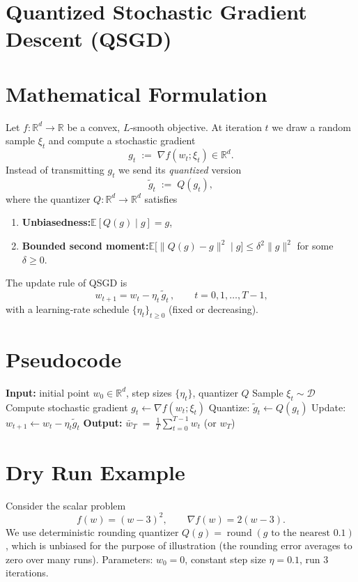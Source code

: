 \documentclass{article}
\newcommand{\E}{\mathbb{E}}
\newcommand{\R}{\mathbb{R}}
\begin{document}
\section*{Quantized Stochastic Gradient Descent (QSGD)}

\section*{Mathematical Formulation}
Let $f:\R^{d}\to\R$ be a convex, $L$‑smooth objective.  
At iteration $t$ we draw a random sample $\xi_{t}$ and compute a stochastic gradient
\[
g_{t}\;:=\;\nabla f(w_{t};\xi_{t})\in\R^{d}.
\]
Instead of transmitting $g_{t}$ we send its \emph{quantized} version
\[
\widetilde g_{t}\;:=\;Q(g_{t}),
\]
where the quantizer $Q:\R^{d}\to\R^{d}$ satisfies  

\begin{enumerate}[label=(\roman*)]
\item \textbf{Unbiasedness:}\quad $\E[Q(g)\mid g]=g$, \;
\item \textbf{Bounded second moment:}\quad $\E\!\big[\|Q(g)-g\|^{2}\mid g\big]\leq\delta^{2}\|g\|^{2}$ for some $\delta\ge0$.
\end{enumerate}
The update rule of QSGD is
\begin{equation}
\boxed{\,w_{t+1}=w_{t}-\eta_{t}\,\widetilde g_{t}\,},\qquad t=0,1,\dots,T-1,
\label{eq:update}
\end{equation}
with a learning‑rate schedule $\{\eta_{t}\}_{t\ge0}$ (fixed or decreasing).

\section*{Pseudocode}
\begin{algorithm}[H]
\caption{Quantized Stochastic Gradient Descent}
\begin{algorithmic}[1]
\State \textbf{Input:} initial point $w_{0}\in\R^{d}$, step sizes $\{\eta_{t}\}$, quantizer $Q$
    \State Sample $\xi_{t}\sim\mathcal{D}$ 
    \State Compute stochastic gradient $g_{t}\gets\nabla f(w_{t};\xi_{t})$
    \State Quantize: $\widetilde g_{t}\gets Q(g_{t})$
    \State Update: $w_{t+1}\gets w_{t}-\eta_{t}\widetilde g_{t}$ \label{alg:update}
\EndFor
\State \textbf{Output:} $ \displaystyle \bar w_{T}\;=\;\frac{1}{T}\sum_{t=0}^{T-1}w_{t}$  (or $w_{T}$)
\end{algorithmic}
\end{algorithm}

\section*{Dry Run Example}
Consider the scalar problem
\[
f(w)=(w-3)^{2},\qquad \nabla f(w)=2(w-3).
\]
We use deterministic rounding quantizer $Q(g)=\operatorname{round}(g\text{ to the nearest }0.1)$, which is unbiased for the purpose of illustration (the rounding error averages to zero over many runs).  
Parameters: $w_{0}=0$, constant step size $\eta=0.1$, run $3$ iterations.
\end{document}
